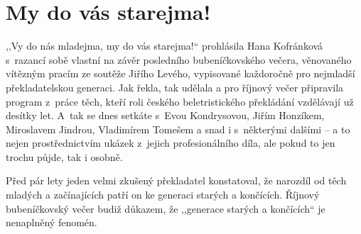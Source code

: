 \section{My do vás starejma!}

\noindent
,,Vy do nás mladejma, my do vás starejma!`` prohlásila Hana Kofránková
s~razancí sobě vlastní na závěr posledního bubeníčkovského večera,
věnovaného vítězným pracím ze soutěže Jiřího Levého, vypisované každoročně
pro nejmladší překladatelskou generaci. Jak řekla, tak udělala a pro
říjnový večer připravila program z~práce těch, kteří roli českého
beletristického překládání vzdělávají už desítky let. A~tak se dnes
setkáte s~Evou Kondrysovou, Jiřím Honzíkem, Miroslavem Jindrou, Vladimírem
Tomešem a snad i s~některými dalšími -- a to nejen prostřednictvím ukázek
z~jejich profesionálního díla, ale pokud to jen trochu půjde, tak i osobně.

Před pár lety jeden velmi zkušený překladatel konstatoval, že
narozdíl od těch mladých a začínajících patří on ke generaci
starých a končících. Říjnový bubeníčkovský večer budiž důkazem, že
,,generace starých a končících`` je nenaplněný fenomén.

